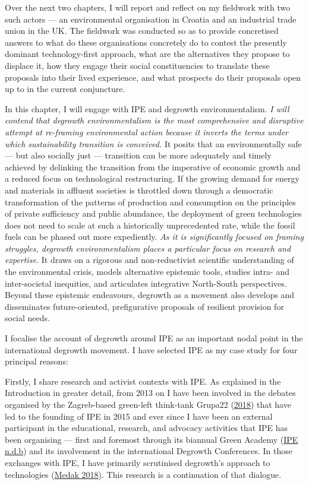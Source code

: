 \documentclass[a4paper, nobind]{templates/ociamthesis}
\begin{document}
Over the next two chapters, I will report and reflect on my fieldwork with two such actors --- an environmental organisation in Croatia and an industrial trade union in the UK. The fieldwork was conducted so as to provide concretised answers to what do these organisations concretely do to contest the presently dominant technology-first approach, what are the alternatives they propose to displace it, how they engage their social constituencies to translate these proposals into their lived experience, and what prospects do their proposals open up to in the current conjuncture.

In this chapter, I will engage with IPE and degrowth environmentalism. \emph{I will contend that degrowth environmentalism is the most comprehensive and disruptive attempt at re-framing environmental action because it inverts the terms under which sustainability transition is conceived.} It posits that an environmentally safe --- but also socially just --- transition can be more adequately and timely achieved by delinking the transition from the imperative of economic growth and a reduced focus on technological restructuring. If the growing demand for energy and materials in affluent societies is throttled down through a democratic transformation of the patterns of production and consumption on the principles of private sufficiency and public abundance, the deployment of green technologies does not need to scale at such a historically unprecedented rate, while the fossil fuels can be phased out more expediently. \emph{As it is significantly focused on framing struggles, degrowth environmentalism places a particular focus on research and expertise.} It draws on a rigorous and non-reductivist scientific understanding of the environmental crisis, models alternative epistemic tools, studies intra- and inter-societal inequities, and articulates integrative North-South perspectives. Beyond these epistemic endeavours, degrowth as a movement also develops and disseminates future-oriented, prefigurative proposals of resilient provision for social needs.

I focalise the account of degrowth around IPE as an important nodal point in the international degrowth movement. I have selected IPE as my case study for four principal reasons:

Firstly, I share research and activist contexts with IPE. As explained in the Introduction in greater detail, from 2013 on I have been involved in the debates organised by the Zagreb-based green-left think-tank Grupa22 (\protect\hyperlink{ref-grupa_22_us_2018}{2018}) that have led to the founding of IPE in 2015 and ever since I have been an external participant in the educational, research, and advocacy activities that IPE has been organising --- first and foremost through its biannual Green Academy (\protect\hyperlink{ref-ipe_green_}{IPE n.d.b}) and its involvement in the international Degrowth Conferences. In those exchanges with IPE, I have primarily scrutinised degrowth's approach to technologies (\protect\hyperlink{ref-medak_technologies_2018}{Medak 2018}). This research is a continuation of that dialogue.
\end{document}
